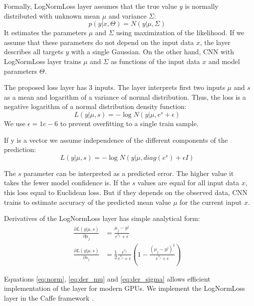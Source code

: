 Formally, LogNormLoss layer assumes that the true value $y$ is normally distributed with unknown mean $\mu$ and variance $\Sigma$:
\begin{equation}
p(y|x, \Theta) = N(y|\mu, \Sigma)
\end{equation}
It estimates the parameters $\mu$ and $\Sigma$ using maximization of the likelihood. If we assume that these parameters do not depend on the input data $x$, the layer describes all targets $y$ with a single Gaussian. On the other hand, CNN with LogNormLoss layer trains $\mu$ and $\Sigma$ as functions of the input data $x$ and model parameters $\Theta$.

The proposed loss layer has 3 inputs. The layer interprets first two inputs $\mu$ and $s$ as a mean and logarithm of a variance of normal distribution. Thus, the loss is a negative logarithm of a normal distribution density function:
\begin{equation}
L(y |\mu, s) = -\log N(y|\mu, e^{s} + \epsilon)
\end{equation}
We use $\epsilon = 1e-6$ to prevent overfitting to a single train sample.

If y is a vector we assume independence of the different components of the prediction:
\begin{equation}
L(y | \mu, s) = -\log N(y|\mu, diag\left(e^{s}\right) + \epsilon I)  \label{eq:norm}
\end{equation}

The $s$ parameter can be interpreted as a predicted error. The higher value it takes the fewer model confidence is. If the $s$ values are equal for all input data $x$, this loss equal to Euclidean loss. But if they depends on the observed data, CNN trains to estimate accuracy of the predicted mean value $\mu$ for the current input $x$.

Derivatives of the LogNormLoss layer has simple analytical form:
\begin{align}
	\frac{\partial L(y | \mu, s)}{\partial \mu_j} &= 
	\frac{\mu_j - y^j}{e^{s_j} + \epsilon}
	\label{eq:der_mu} \\
	\frac{\partial L(y | \mu, s)}{\partial s_j} &= 
	\frac{1}{2}\frac{e^{s_j}}{e^{s_j} + \epsilon}
	\left(1 - \frac{(\mu_j - y^j) ^ 2}{e^{s_j} + \epsilon}\right)  \label{eq:der_sigma}
\end{align}

Equations \eqref{eq:norm}, \eqref{eq:der_mu} and \eqref{eq:der_sigma} allows efficient implementation of the layer for modern GPUs. We implement the LogNormLoss layer in the Caffe framework \cite{jia2014caffe}.

